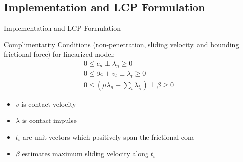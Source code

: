 \subsection{Implementation and LCP Formulation}
\begin{frame}{Implementation and LCP Formulation \cite{ErlebenK}}

    Complimentarity Conditions (non-penetration, sliding velocity, and bounding frictional force) for linearized model:
    \begin{align*}
        0 \leq v_n \perp \lambda_n \geq 0 \\
        0 \leq \beta e + v_t \perp \lambda_t \geq 0 \\
        0 \leq (\mu\lambda_n-\sum_i \lambda_t_i) \perp \beta \geq  0 
    \end{align*}
    
    \begin{itemize}
        \item $v$ is contact velocity 
        \item $\lambda$ is contact impulse
        \item $t_i$ are unit vectors which positively span the frictional cone
        \item $\beta$ estimates maximum sliding velocity along $t_i$
    \end{itemize}
\end{frame}

